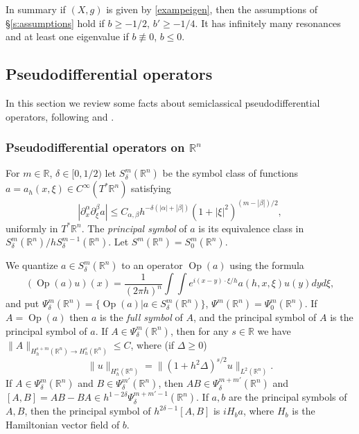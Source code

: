 \documentclass[reqno, 12pt]{amsart}
\newcommand \R {\mathbb{R}}
\newcommand \D {\partial}
\DeclareMathOperator \Op {Op}
\theoremstyle{definition}
\numberwithin{equation}{section}
\numberwithin{prop}{section}
\numberwithin{figure}{section}
\begin{document}
In summary if $(X,g)$ is given by \eqref{exampeigen}, then the assumptions of \S\ref{s:assumptions} hold if $b \ge -1/2$, $b' \ge -1/4$. It has infinitely many resonances and at least one eigenvalue if $b \not\equiv 0$, $b \le 0$.



\subsection{Pseudodifferential operators}\label{secpseudor}
In this section we review some facts about semiclassical pseudodifferential operators, following \cite{ds} and \cite{ez}.

\subsubsection{Pseudodifferential operators on $\R^n$} For $m \in \R$, $\delta \in [0,1/2)$ let $S_\delta^m(\R^n)$ be the symbol class of functions $a = a_h(x,\xi) \in C^\infty(T^*\R^n)$ satisfying
\begin{equation}\label{symboldef}
\left|\D^\alpha_x \D^\beta_\xi a\right| \le C_{\alpha,\beta} h^{-\delta(|\alpha| + |\beta|)} (1+|\xi|^2)^{(m-|\beta|)/2},
\end{equation}
uniformly in $T^*\R^n$. The \textit{principal symbol} of $a$ is its equivalence class  in $S_\delta^{m}(\R^n) / h S_\delta^{m-1}(\R^n)$. Let $S^m(\R^n) = S^m_0(\R^n)$.

We quantize $a \in S_\delta^m(\R^n)$ to an operator $\Op(a)$ using the formula
\begin{equation}\label{quantdef}(\Op(a) u)(x) = \frac 1 {(2\pi h)^n} \int\!\!\!\int e^{i(x-y)\cdot\xi/h}a\left(h,x,\xi\right)u(y)dyd\xi,\end{equation}
and put $\Psi_\delta^m(\R^n) = \{\Op(a)| a \in S_\delta^m(\R^n)\}$, $\Psi^m(\R^n) = \Psi^m_0(\R^n)$. If $A = \Op(a)$ then $a$ is the \textit{full symbol} of $A$, and the principal symbol of $A$ is the principal symbol of $a$.
If $A \in \Psi_\delta^m(\R^n)$, then for any $s \in \R$ we have $\|A\|_{H^{s+m}_h(\R^n) \to H^s_h(\R^n)} \le C$, where (if $\Delta \ge0$)
\[\|u\|_{H^s_h(\R^n)} = \|(1 + h^2\Delta)^{s/2}u\|_{L^2(\R^n)}.\]
If $A \in \Psi_\delta^m(\R^n)$ and $B \in \Psi_\delta^{m'}(\R^n)$, then $AB \in \Psi_\delta^{m+m'} (\R^n)$ and $[A,B] = AB - BA \in h^{1-2\delta}\Psi_\delta^{m+m'-1} (\R^n)$. If $a, b$ are  the  principal symbols of $A, B$, then the  principal symbol of $h^{2\delta-1}[A,B]$ is $i H_ba$, where $H_b$ is the Hamiltonian vector field of $b$.
\end{document}
